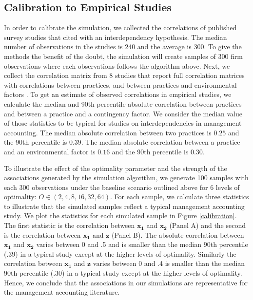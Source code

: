 \documentclass[12pt]{article}
\begin{document}
\subsection{Calibration to Empirical Studies}\label{optimality}

In order to calibrate the simulation, we collected the correlations of published survey studies that cited \citet{grabner_management_2013} with an interdependency hypothesis. The median number of observations in the studies is 240 and the average is 300. To give the methods the benefit of the doubt, the simulation will create samples of 300 firm observations where each observations follows the algorithm above. Next, we collect the correlation matrix from 8 studies that report full correlation matrices with correlations between practices, and between practices and environmental factors \citep{dekker_collaborative_2016, grabner_cost_2016, bedford_configurations_2015, heinicke_examination_2016, bedford_performance_2019, abernethy_are_2015, sponem_exploring_2016, samagaio_management_2018}. To get an estimate of observed correlations in empirical studies, we calculate the median and 90th percentile absolute correlation between practices and between a practice and a contingency factor. We consider the median value of those statistics to be typical for studies on interdependencies in management accounting. The median absolute correlation between two practices is $0.25$ and the 90th percentile is $0.39$. The median absolute correlation between a practice and an environmental factor is $0.16$ and the 90th percentile is $0.30$.

To illustrate the effect of the optimality parameter and the strength of the associations generated by the simulation algorithm, we generate 100 samples with each 300 observations under the baseline scenario outlined above for 6 levels of optimality: $O \in  (2, 4, 8, 16, 32, 64)$. For each sample, we calculate three statistics to illustrate that the simulated samples reflect a typical management accounting study. We plot the statistics for each simulated sample in Figure \ref{calibration}. The first statistic is the correlation between $\mathbf{x_1}$ and $\mathbf{x_2}$ (Panel A) and the second is the correlation between $\mathbf{x_1}$ and $\mathbf{z}$ (Panel B). The absolute correlation between $\mathbf{x_1}$ and $\mathbf{x_2}$ varies between 0 and .5 and is smaller than the median 90th percentile ($.39$) in a typical study except at the higher levels of optimality. Similarly the correlation between $\mathbf{x_1}$ and $\mathbf{z}$ varies between 0 and .4 is smaller than the median 90th percentile (.30) in a typical study except at the higher levels of optimality. Hence, we conclude that the associations in our simulations are representative for the management accounting literature. 
\end{document}
